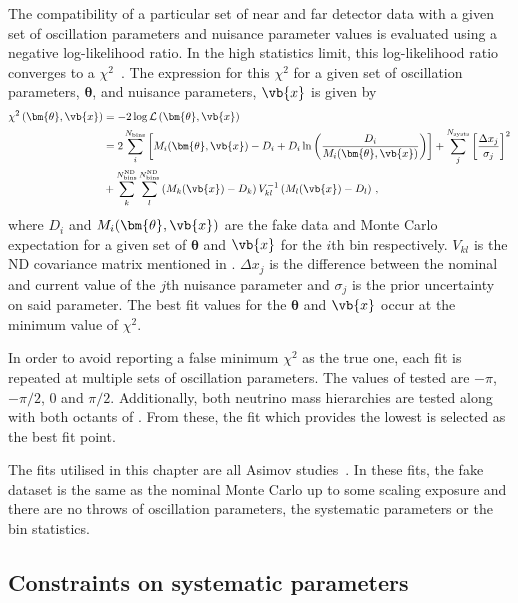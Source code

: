 The compatibility of a particular set of near and far detector data with a given set of oscillation parameters and nuisance parameter values is evaluated using a negative log-likelihood ratio.
In the high statistics limit, this log-likelihood ratio converges to a $\chi^{2}$~\cite{pdg2018}.
The expression for this $\chi^{2}$ for a given set of oscillation parameters, $\bm{\theta}$, and nuisance parameters, $\vb{x}$ is given by
\begin{align}
	\chi^{2} \left( \bm{\theta}, \vb{x} \right) &= -2 \log \mathcal{L} \left( \bm{\theta}, \vb{x} \right) \\
	&= 2 \sum_{i}^{N_{\text{bins}}} \left[ M_{i} (\bm{\theta}, \vb{x}) - D_{i} + D_{i} \ln \left( \frac{D_{i}}{M_{i}(\bm{\theta}, \vb{x})} \right) \right] + \sum_{j}^{N_{\text{systs}}} \left[ \frac{\Delta x_{j}}{\sigma_{j}} \right]^{2} \\
	&+ \sum_{k}^{N^{\text{ND}}_{\text{bins}}} \sum_{l}^{ N_{\text{bins}}^{\text{ND}} } \left(  M_{k} (\vb{x}) - D_{k} \right) V_{kl}^{-1} \left( M_{l}(\vb{x}) - D_{l} \right) \, ,
\end{align}
where $D_{i}$ and $M_{i}(\bm{\theta}, \vb{x})$ are the fake data and Monte Carlo expectation for a given set of $\bm{\theta}$ and $\vb{x}$ for the $i$th bin respectively. 
$V_{kl}$ is the ND covariance matrix mentioned in .
$\Delta x_{j}$ is the difference between the nominal and current value of the $j$th nuisance parameter and $\sigma_{j}$ is the prior uncertainty on said parameter.
The best fit values for the $\bm{\theta}$ and $\vb{x}$ occur at the minimum value of $\chi^{2}$.

In order to avoid reporting a false minimum $\chi^{2}$ as the true one, each fit is repeated at multiple sets of oscillation parameters. 
The values of \dcp tested are $-\pi$, $-\pi/2$, 0 and $\pi/2$. 
Additionally, both neutrino mass hierarchies are tested along with both octants of .
From these, the fit which provides the lowest \chisquare is selected as the best fit point.

The fits utilised in this chapter are all Asimov studies~\cite{asimov}.
In these fits, the fake dataset is the same as the nominal Monte Carlo up to some scaling exposure and there are no throws of oscillation parameters, the systematic parameters or the bin statistics.

\subsection{Constraints on systematic parameters}

